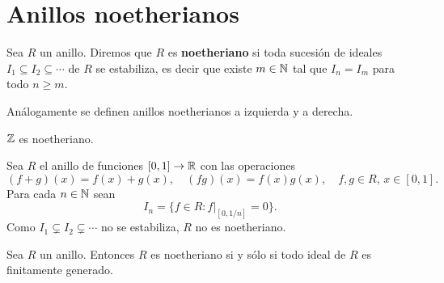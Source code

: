 \chapter{Anillos noetherianos}

\begin{definition}
Sea $R$ un anillo. Diremos que $R$ es \textbf{noetheriano} si toda sucesión de ideales $I_1\subseteq I_2\subseteq\cdots $ de $R$ 
se estabiliza, es decir que existe $m\in\mathbb{N}$ tal que 
$I_n=I_m$ para todo $n\geq m$. 
\end{definition}

Análogamente se definen anillos noetherianos a izquierda y a derecha. 


\begin{example}
$\mathbb{Z}$ es noetheriano.
\end{example}

%
\begin{example}
Sea $R$ el anillo de funciones $[0,1]\to\mathbb{R}$ 
con las operaciones
\[
(f+g)(x)=f(x)+g(x),\quad
(fg)(x)=f(x)g(x),\quad
f,g\in R,\,x\in [0,1].
\]
Para cada $n\in\mathbb{N}$ sean  
\[
I_n=\{f\in R:f|_{[0,1/n]}=0\}.
\]
Como $I_1\subsetneq I_2\subsetneq\cdots$ no se estabiliza, $R$ no es noetheriano. 
\end{example}

\begin{theorem}
	Sea $R$ un anillo. Entonces $R$ es noetheriano si y sólo si todo ideal de $R$ es finitamente generado.
\end{theorem}

